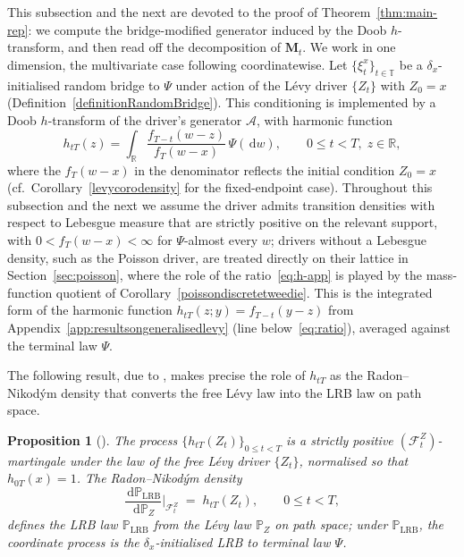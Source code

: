 \documentclass{article}
\newtheorem{prop}[thm]{Proposition}
\newcommand{\levy}{{L\'evy }}
\def\R{\mathbb{R}}
\def\P{\mathbb{P}}
\def\T{\mathbb{T}}
\def\d{\,\mathrm{d}}
\theoremstyle{definition}
\begin{document}
This subsection and the next are devoted to the proof of Theorem~\ref{thm:main-rep}: we compute the bridge-modified generator induced by the Doob $h$-transform, and then read off the decomposition of $\mathbf{M}_t$. We work in one dimension, the multivariate case following coordinatewise. Let $\{\xi^{x}_t\}_{t \in \T}$ be a $\delta_x$-initialised random bridge to $\Psi$ under action of the \levy driver $\{Z_t\}$ with $Z_0 = x$ (Definition~\ref{definitionRandomBridge}). This conditioning is implemented by a Doob $h$-transform of the driver's generator $\mathcal{A}$, with harmonic function
\begin{equation}\label{eq:h-app}
  h_{tT}(z) = \int_{\R} \frac{f_{T-t}(w - z)}{f_T(w - x)}\,\Psi(\d w),
  \qquad 0 \leq t < T,\; z \in \R,
\end{equation}
where the $f_T(w - x)$ in the denominator reflects the initial condition $Z_0 = x$ (cf.\ Corollary~\ref{levycorodensity} for the fixed-endpoint case). Throughout this subsection and the next we assume the driver admits transition densities with respect to Lebesgue measure that are strictly positive on the relevant support, with $0 < f_T(w - x) < \infty$ for $\Psi$-almost every $w$; drivers without a Lebesgue density, such as the Poisson driver, are treated directly on their lattice in Section~\ref{sec:poisson}, where the role of the ratio~\eqref{eq:h-app} is played by the mass-function quotient of Corollary~\ref{poissondiscretetweedie}. This is the integrated form of the harmonic function $h_{tT}(z;y) = f_{T-t}(y - z)$ from Appendix~\ref{app:resultsongeneralisedlevy} (line below~\eqref{eq:ratio}), averaged against the terminal law $\Psi$.

The following result, due to \cite{hoylehughstonmacrina_2011}, makes precise the role of $h_{tT}$ as the Radon--Nikod\'ym density that converts the free \levy law into the LRB law on path space.

\begin{prop}[{\cite[Proposition~2.7]{hoylehughstonmacrina_2011}}]
\label{prop:lrb-change-of-measure}
The process $\{h_{tT}(Z_t)\}_{0 \leq t < T}$ is a strictly positive $(\mathcal{F}_t^Z)$-martingale under the law of the free \levy driver $\{Z_t\}$, normalised so that $h_{0T}(x) = 1$. The Radon--Nikod\'ym density
\begin{equation}\label{eq:lrb-rn-density}
  \frac{\d \P_{\mathrm{LRB}}}{\d \P_Z}\bigg|_{\mathcal{F}_t^Z} \;=\; h_{tT}(Z_t),
  \qquad 0 \leq t < T,
\end{equation}
defines the LRB law $\P_{\mathrm{LRB}}$ from the \levy law $\P_Z$ on path space; under $\P_{\mathrm{LRB}}$, the coordinate process is the $\delta_x$-initialised LRB to terminal law $\Psi$.
\end{prop}
\end{document}

